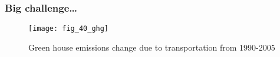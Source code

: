 \begin{frame}
\frametitle{Big challenge\dots}
\begin{figure}
    \texttt{[image: fig\_40\_ghg]}
    \caption{Green house emissions change due to transportation from 1990-2005}
\end{figure}
\end{frame}